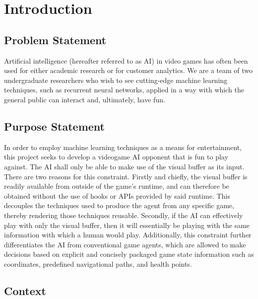 \chapter{Introduction}


\section{Problem Statement}

Artificial intelligence (hereafter referred to as AI) in video games has often been used for either academic research or for customer analytics. We are a team of two undergraduate researchers who wish to see cutting-edge machine learning techniques, such as recurrent neural networks, applied in a way with which the general public can interact and, ultimately, have fun.




\section{Purpose Statement}

 In order to employ machine learning techniques as a means for entertainment, this project seeks to develop a videogame AI opponent that is fun to play against. The AI shall only be able to make use of the visual buffer as its input. There are two reasons for this constraint. Firstly and chiefly, the visual buffer is readily available from outside of the game's runtime, and can therefore be obtained without the use of hooks or APIs provided by said runtime. This decouples the techniques used to produce the agent from any specific game, thereby rendering those techniques reusable. Secondly, if the AI can effectively play with only the visual buffer, then it will essentially be playing with the same information with which a human would play. Additionally, this constraint further differentiates the AI from conventional game agents, which are allowed to make decisions based on explicit and concisely packaged game state information such as coordinates, predefined navigational paths, and health points.




\section{Context}

